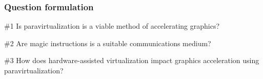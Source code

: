 \begin{frame}
\frametitle{Question formulation}

\begin{block}{\#1}
  Is paravirtualization is a viable method of accelerating graphics?
\end{block}

\begin{block}{\#2}
  Are magic instructions is a suitable communications medium?
\end{block}

\begin{block}{\#3}
  How does hardware-assisted virtualization impact graphics acceleration using paravirtualization?
\end{block}

\end{frame}
